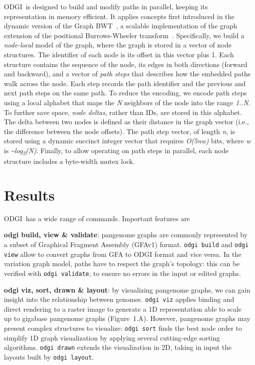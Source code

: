\documentclass{bioinfo}
\newcommand{\odgi}{ODGI}
\newcommand{\cmd}[1]{{\texttt{#1}}}
\newcommand{\cmdbf}[1]{{\textbf{#1}}}
\newcommand{\topic}[1]{{\cmdbf{#1}}:}
\begin{document}
    \odgi\ is designed to build and modify paths in parallel, keeping its representation in memory efficient. It
    applies concepts first introduced in the dynamic version of the Graph BWT~\citep{31406990}, a scalable
    implementation of the graph extension of the positional Burrows-Wheeler transform~\citep{28702075}. Specifically,
    we build a \textit{node-local} model of the graph, where the graph is stored in a vector of node structures.
    The identifier of each node is its offset in this vector plus 1. Each structure contains the sequence of the
    node, its edges in both directions (forward and backward), and a vector of \textit{path steps} that describes
    how the embedded paths walk across the node. Each step records the path identifier and the previous and next
    path steps on the same path. To reduce the encoding, we encode path steps using a local alphabet that maps the
    \textit{N} neighbors of the node into the range \textit{1..N}. To further save space, \textit{node deltas},
    rather than IDs, are stored in this alphabet. The delta between two nodes is defined as their distance in the
    graph vector (i.e., the difference between the node offsets). The path step vector, of length \textit{n}, is
    stored using a dynamic succinct integer vector that requires \textit{O(5nw)} bits, where \textit{w} is
    \textit{\textasciitilde log\textsubscript{2}(N)}. Finally, to allow operating on path steps in parallel, each node
    structure includes a byte-width mutex lock.


    \section{Results}

    \odgi\ has a wide range of commands. Important features are

    \topic{odgi build, view \& validate} pangenome graphs are commonly
    represented by a subset of Graphical Fragment Assembly (GFAv1)
    format\citep{GFAv1}.  \cmd{odgi build} and \cmd{odgi view} allow
    to convert graphs from GFA to ODGI format and vice versa. In the
    variation graph model, paths have to respect the graph's topology:
    this can be verified with \texttt{odgi validate}, to ensure no
    errors in the input or edited graphs.

    \topic{odgi viz, sort, drawn \& layout} by visualizing pangenome
    graphs, we can gain insight into the relationship between
    genomes. \cmd{odgi viz} applies binding and direct rendering to
    a raster image to generate a 1D representation able to scale up to
    gigabase pangenome graphs
    (Figure~1.A\vphantom{\ref{fig:01}}). However, pangenome graphs may
    present complex structures to visualize: \cmd{odgi sort} finds
    the best node order to simplify 1D graph visualization by applying
    several cutting-edge sorting algorithms. \cmd{odgi drawn}
    extends the visualization in 2D, taking in input the layouts built
    by \cmd{odgi layout}.
\end{document}

